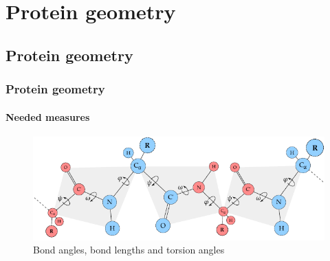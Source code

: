 \documentclass{beamer}
\begin{document}
\section{Protein geometry}
\subsection{Protein geometry}
\begin{frame}[t, fragile]
  \frametitle{Protein geometry}
  \framesubtitle{Needed measures}
  
  \vspace{0.5cm}

  \begin{figure}
    \centering
    \includegraphics[width=\textwidth]{../rapport/figures/protein-torsion-angles.pdf}
    \caption{Bond angles, bond lengths and torsion angles}
    \label{fig:front}
  \end{figure}

\end{frame}
\end{document}
